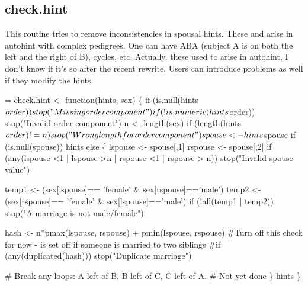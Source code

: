 \documentclass{article}
\begin{document}
\subsection{check.hint}
This routine tries to remove inconsistencies in spousal hints.
These and arise in autohint with complex pedigrees.
One can have ABA (subject A is on both the
left and the right of B), cycles, etc. 
Actually, these used to arise in autohint, I don't know if it's so
after the recent rewrite.
Users can introduce problems as well if they modify the hints.

\begin{nwchunk}
=
 check.hint <- function(hints, sex) \{
     if (is.null(hints$order)) stop("Missing order component")
     if (!is.numeric(hints$order)) stop("Invalid order component")
     n <- length(sex)
     if (length(hints$order) != n) stop("Wrong length for order component")
     
     spouse <- hints$spouse
     if (is.null(spouse)) hints
     else \{
         lspouse <- spouse[,1]
         rspouse <- spouse[,2]
         if (any(lspouse <1 | lspouse >n | rspouse <1 | rspouse > n))
             stop("Invalid spouse value")
         
         temp1 <- (sex[lspouse]== 'female' & sex[rspouse]=='male')
         temp2 <- (sex[rspouse]== 'female' & sex[lspouse]=='male')
         if (!all(temp1 | temp2))
             stop("A marriage is not male/female")
         
         hash <- n*pmax(lspouse, rspouse) + pmin(lspouse, rspouse)
         #Turn off this check for now - is set off if someone is married to two siblings
         #if (any(duplicated(hash))) stop("Duplicate marriage")
 
         # Break any loops: A left of B, B left of C, C left of A.
         #  Not yet done 
       \}
     hints
   \}
\end{nwchunk}
\end{document}
